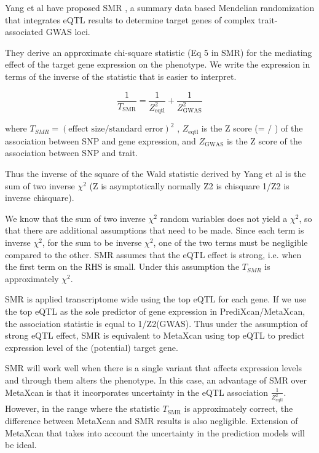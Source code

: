 \documentclass[10pt]{article}
\begin{document}
Yang et al have proposed SMR \cite{SMR}, a summary data based Mendelian randomization that integrates eQTL results to determine target genes of complex trait-associated GWAS loci. 

They derive an approximate chi-square statistic (Eq 5 in SMR) for the mediating effect of the target gene expression on the phenotype. We write the expression in terms of the inverse of the statistic that is easier to interpret. 

\begin{equation}
\frac{1}{T_\text{SMR}} = \frac{1}{Z^2_\text{eqtl}} + \frac{1}{Z^2_\text{GWAS}}  
\label{eq5-SMR}
\end{equation}

where $T_{SMR}=(\text{effect size} / \text{standard error})^2$ , $Z_\text{eqtl}$ is the Z score (= / ) of the association between SNP and gene expression, and $Z_\text{GWAS}$ is the Z score of the association between SNP and trait. 

Thus the inverse of the square of the Wald statistic derived by Yang et al is the sum of two inverse $\chi^2$ (Z is asymptotically normally  Z2 is chisquare  1/Z2 is inverse chisquare). 

We know that the sum of two inverse $\chi^2$ random variables does not yield a $\chi^2$, so that there are additional assumptions that need to be made. Since each term is inverse  $\chi^2$, for the sum to be inverse  $\chi^2$, one of the two terms must be negligible compared to the other. SMR assumes that the eQTL effect is strong, i.e. when the first term on the RHS is small. Under this assumption the $T_{SMR}$ is approximately $\chi^2$.

SMR is applied transcriptome wide using the top eQTL for each gene. If we use the top eQTL as the sole predictor of gene expression in PrediXcan/MetaXcan, the association statistic is equal to 1/Z2(GWAS). Thus under the assumption of strong eQTL effect, SMR is equivalent to MetaXcan using top eQTL to predict expression level of the (potential) target gene.

SMR will work well when there is a single variant that affects expression levels and through them alters the phenotype. In this case, an advantage of SMR over MetaXcan is that it incorporates uncertainty in the eQTL association $\frac{1}{Z^2_\text{eqtl}}$. However, in the range where the statistic $T_\text{SMR}$ is approximately correct, the difference between MetaXcan and SMR results is also negligible. Extension of MetaXcan that takes into account the uncertainty in the prediction models will be ideal.
\end{document}
